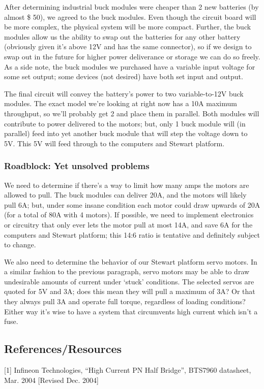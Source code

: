 \documentclass[a4paper, 10pt]{article}
\begin{document}
		After determining industrial buck modules were cheaper than 2 new batteries (by almost \$ 50), we agreed to the buck modules. Even though the circuit board will be more complex, the physical system will be more compact. Further, the buck modules allow us the ability to swap out the batteries for any other battery (obviously given it's above 12V and has the same connector), so if we design to swap out in the future for higher power deliverance or storage we can do so freely. As a side note, the buck modules we purchased have a variable input voltage for some set output; some devices (not desired) have both set input and output.
		
		The final circuit will convey the battery's power to two variable-to-12V buck modules. The exact model we're looking at right now has a 10A maximum throughput, so we'll probably get 2 and place them in parallel. Both modules will contribute to power delivered to the motors; but, only 1 buck module will (in parallel) feed into yet another buck module that will step the voltage down to 5V. This 5V will feed through to the computers and Stewart platform.
		
		\subsubsection{Roadblock: Yet \textbf{unsolved} problems}
		We need to determine if there's a way to limit how many amps the motors are allowed to pull. The buck modules can deliver 20A, and the motors will likely pull 6A; but, under some insane condition each motor could draw upwards of 20A (for a total of 80A with 4 motors). If possible, we need to implement electronics or circuitry that only ever lets the motor pull at most 14A, and save 6A for the computers and Stewart platform; this 14:6 ratio is tentative and definitely subject to change.
		
		We also need to determine the behavior of our Stewart platform servo motors. In a similar fashion to the previous paragraph, servo motors may be able to draw undesirable amounts of current under `stuck' conditions. The selected servos are quoted for 5V and 3A; does this mean they will pull a maximum of 3A? Or that they always pull 3A and operate full torque, regardless of loading conditions? Either way it's wise to have a system that circumvents high current which isn't a fuse.
		
	\subsection{References/Resources}
		[1] Infineon Technologies, ``High Current PN Half Bridge'', BTS7960 datasheet, Mar. 2004 [Revised Dec. 2004]
		
\end{document}
